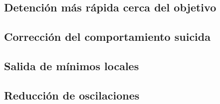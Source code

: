 \documentclass[a4paper, 11pt, titlepage]{article}
\begin{document}
  \subsection{Detención más rápida cerca del objetivo}

  \subsection{Corrección del comportamiento suicida}

  \subsection{Salida de mínimos locales}

  \subsection{Reducción de oscilaciones}
\end{document}
